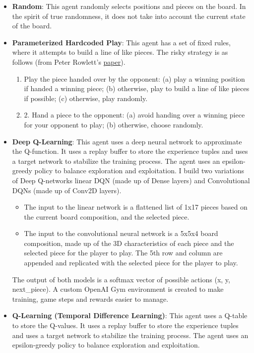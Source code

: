 \begin{itemize}
    \item \textbf{Random}: This agent randomly selects positions and pieces on the board. In the spirit of true randomness, it does not take into account the current state of the board.
    \item \textbf{Parameterized Hardcoded Play}: This agent has a set of fixed rules, where it attempts to build a line of like pieces. The risky strategy is as follows (from Peter Rowlett's \href{https://scholarworks.umt.edu/cgi/viewcontent.cgi?article=1334&context=tme}{paper}).
    \begin{enumerate}
        \item  Play the piece handed over by the opponent:  (a) play a winning position if handed a winning piece; (b) otherwise, play to build a line of like pieces if possible;  (c) otherwise, play randomly.
        \item 2. Hand a piece to the opponent: (a) avoid handing over a winning piece for your opponent to play; (b) otherwise, choose randomly.
    \end{enumerate}

    \item \textbf{Deep Q-Learning}: This agent uses a deep neural network to approximate the Q-function. It uses a replay buffer to store the experience tuples and uses a target network to stabilize the training process. The agent uses an epsilon-greedy policy to balance exploration and exploitation. I build two variations of Deep Q-networks linear DQN (made up of Dense layers) and Convolutional DQNs (made up of Conv2D layers).
    \begin{itemize}
        \item The input to the linear network is a flattened list of 1x17 pieces based on the current board composition, and the selected piece.
        \item The input to the convolutional neural network is a 5x5x4 board composition, made up of the 3D characteristics of each piece and the selected piece for the player to play. The 5th row and column are appended and replicated with the selected piece for the player to play.
    \end{itemize}
    The output of both models is a softmax vector of possible actions (x, y, next\_piece).
    A custom OpenAI Gym environment is created to make training, game steps and rewards easier to manage.

    \item \textbf{Q-Learning (Temporal Difference Learning)}: This agent uses a Q-table to store the Q-values. It uses a replay buffer to store the experience tuples and uses a target network to stabilize the training process. The agent uses an epsilon-greedy policy to balance exploration and exploitation.


\end{itemize}
